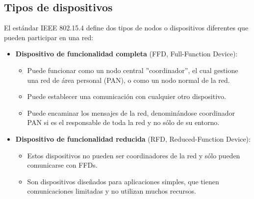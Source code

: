 \subsection{Tipos de dispositivos} %
El estándar IEEE 802.15.4 define dos tipos de nodos o dispositivos diferentes que pueden participar en una red:
\begin{itemize}
\item{\bf Dispositivo de funcionalidad completa} (FFD, Full-Function Device):
\begin{itemize}
\item Puede funcionar como un nodo central ''coordinador'', el cual gestione una red de área personal (PAN), o como un nodo normal de la red.
\item Puede establecer una comunicación con cualquier otro dispositivo.
\item Puede encaminar los mensajes de la red, denominándose coordinador PAN si es el responsable de toda la red y no sólo de su entorno.
\end{itemize}
\item{\bf Dispositivo de funcionalidad reducida} (RFD, Reduced-Function Device):
\begin{itemize}
\item Estos dispositivos no pueden ser coordinadores de la red y sólo pueden comunicarse con FFDs.
\item Son dispositivos diseñados para aplicaciones simples, que tienen comunicaciones limitadas y no utilizan muchos recursos.
\end{itemize}
\end{itemize}

